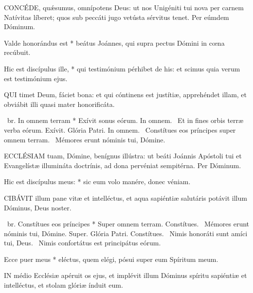 
\lettrine[lines=2]{C}{ONCÉDE}, quǽsumus, omnípotens Deus: ut nos Unigéniti tui nova per carnem Natívitas líberet; quos sub peccáti jugo vetústa sérvitus tenet. Per eúmdem Dóminum.


 Valde honorándus est * beátus Joánnes, qui supra pectus Dómini in cœna recúbuit.


 Hic est discípulus ille, * qui testimónium pérhibet de his: et scimus quia verum est testimónium ejus.


\lettrine[lines=2]{Q}{UI} timet Deum, fáciet bona: et qui cóntinens est justítiæ, apprehéndet illam, et obviábit illi quasi mater honorificáta.

\R\ br. In omnem terram * Exívit sonus eórum. In omnem. \V\ Et in fines orbis terræ verba eórum. Exívit. Glória Patri. In omnem. \V\ Constítues eos príncipes super omnem terram. \R\ Mémores erunt nóminis tui, Dómine.


\lettrine[lines=2]{E}{CCLÉSIAM} tuam, Dómine, benígnus illústra: ut beáti Joánnis Apóstoli tui et Evangelístæ illumináta doctrínis, ad dona pervéniat sempitérna. Per Dóminum.


 Hic est discípulus meus: * sic eum volo manére, donec véniam.


\lettrine[lines=2]{C}{IBÁVIT} illum pane vitæ et intelléctus, et aqua sapiéntiæ salutáris potávit illum Dóminus, Deus noster.

\R\ br. Constítues eos príncipes * Super omnem terram. Constítues. \V\ Mémores erunt nóminis tui, Dómine. Super. Glória Patri. Constítues. \V\ Nimis honoráti sunt amíci tui, Deus. \R\ Nimis confortátus est principátus eórum.


 Ecce puer meus * eléctus, quem elégi, pósui super eum Spíritum meum.


\lettrine[lines=2]{I}{N} médio Ecclésiæ apéruit os ejus, et implévit illum Dóminus spíritu sapiéntiæ et intelléctus, et stolam glóriæ índuit eum.

